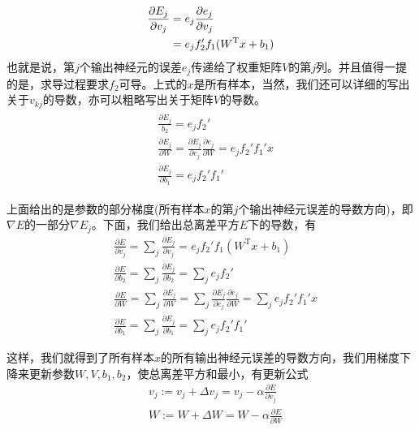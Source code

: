 {            \begin{align}
            \label{全BP导数计算公式1}
            \frac{\partial E_j}{\partial v_j} &= e_j\frac{\partial e_j}{\partial v_j} \notag \\
            &= e_j f_2'f_1(W^\mathrm{T}x+b_1)
            \end{align}
            也就是说，第$j$个输出神经元的误差$e_j$传递给了权重矩阵$V$的第$j$列。并且值得一提的是，求导过程要求$f_2$可导。上式的$x$是所有样本，当然，我们还可以详细的写出关于$v_{kj}$的导数，亦可以粗略写出关于矩阵$V$的导数。
            \begin{align}
            \label{全BP导数计算公式2}
            \begin{aligned}
            & \frac{\partial E_j}{b_2} = e_j f_2'\\
            & \frac{\partial E_j}{\partial W} = \frac{\partial E_j}{\partial e_j}\frac{\partial e_j}{\partial W}=e_j f_2'f_1'x\\
            & \frac{\partial E_j}{\partial b_1} = e_jf_2'f_1'
            \end{aligned}
            \end{align}
            \par
            上面给出的是参数的部分梯度(所有样本$x$的第$j$个输出神经元误差的导数方向)，即$\nabla E$的一部分$\nabla E_j$。下面，我们给出总离差平方$E$下的导数，有
            \begin{align*}
            & \frac{\partial E}{\partial v_j} = \sum_j\frac{\partial E_j}{\partial v_j} = e_j f_2'f_1(W^\mathrm{T}x+b_1)\\
            & \frac{\partial E}{\partial b_2} = \sum_j\frac{\partial E_j}{\partial b_2} =\sum_j e_j f_2'\\
            & \frac{\partial E}{\partial W} = \sum_j\frac{\partial E_j}{\partial W} = \sum_j\frac{\partial E_j}{\partial e_j}\frac{\partial e_j}{\partial W} = \sum_j e_j f_2'f_1'x\\
            & \frac{\partial E}{\partial b_1} = \sum_j\frac{\partial E_j}{\partial b_1} = \sum_j e_jf_2'f_1'
            \end{align*}
            \par
            这样，我们就得到了所有样本$x$的所有输出神经元误差的导数方向，我们用梯度下降来更新参数$W,V,b_1,b_2$，使总离差平方和最小，有更新公式
            \begin{align*}
            & v_j :=v_j+\Delta v_j = v_j-\alpha \frac{\partial E}{\partial v_j}\\
            & W:=W + \Delta W = W - \alpha \frac{\partial E}{\partial W}\\

\end{align*}}
